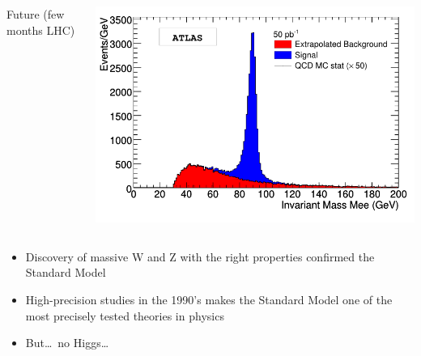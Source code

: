 \documentclass[compress]{beamer}
\begin{document}
\begin{frame}
\begin{columns}
\begin{center}
Future (few months LHC)
\end{center}
\includegraphics[width=\linewidth]{InvMasse10_CORINNE.png}
\end{columns}

\vfill
\begin{itemize}
\item Discovery of massive W and Z with the right properties confirmed
  the Standard Model

\item High-precision studies in the 1990's makes the Standard Model
  one of the most precisely tested theories in physics

\item But\ldots\ no Higgs\ldots

\end{itemize}
\end{frame}
\end{document}

